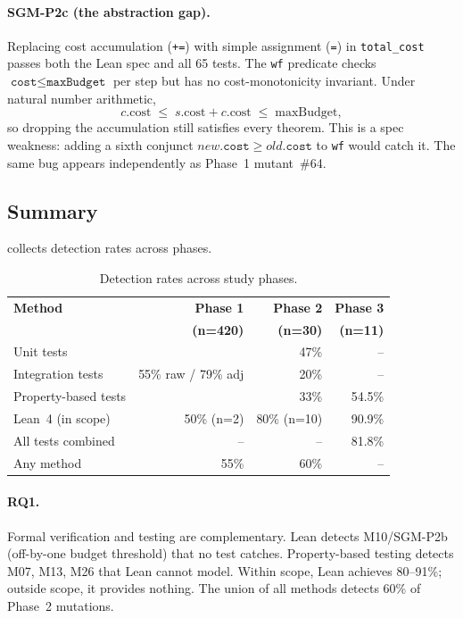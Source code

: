\documentclass[11pt,a4paper]{article}
\begin{document}
\paragraph{SGM-P2c (the abstraction gap).}
Replacing cost accumulation (\texttt{+=}) with simple assignment
(\texttt{=}) in \texttt{total\_cost} passes both the Lean spec and all
65 tests. The \texttt{wf} predicate checks
$\texttt{cost} \leq \texttt{maxBudget}$ per step but has no
cost-monotonicity invariant. Under natural number arithmetic,
\[
  c.\text{cost} \;\leq\; s.\text{cost} + c.\text{cost}
  \;\leq\; \text{maxBudget},
\]
so dropping the accumulation still satisfies
every theorem. This is a spec weakness: adding a sixth conjunct
$\textit{new}.\texttt{cost} \geq \textit{old}.\texttt{cost}$
to \texttt{wf} would catch it.
The same bug appears independently as Phase~1 mutant~\#64.

\subsection{Summary}

 collects detection rates across phases.

\begin{table}[htbp]
\centering
\caption{Detection rates across study phases.}
\label{tab:combined}
\small
\begin{tabular}{@{}lrrr@{}}
\toprule
\textbf{Method} & \textbf{Phase 1} & \textbf{Phase 2} & \textbf{Phase 3} \\
 & \textbf{(n=420)} & \textbf{(n=30)} & \textbf{(n=11)} \\
\midrule
Unit tests & \multirow{3}{*}{55\% raw / 79\% adj} & 47\% & -- \\
Integration tests & & 20\% & -- \\
Property-based tests & & 33\% & 54.5\% \\
Lean~4 (in scope) & 50\% (n=2) & 80\% (n=10) & 90.9\% \\
All tests combined & -- & -- & 81.8\% \\
Any method & 55\% & 60\% & -- \\
\bottomrule
\end{tabular}
\end{table}

\paragraph{RQ1.}
Formal verification and testing are complementary. Lean detects
M10/SGM-P2b (off-by-one budget threshold) that no test catches.
Property-based testing detects M07, M13, M26 that Lean cannot model.
Within scope, Lean achieves 80--91\%; outside scope, it provides
nothing. The union of all methods detects 60\% of Phase~2 mutations.
\end{document}
